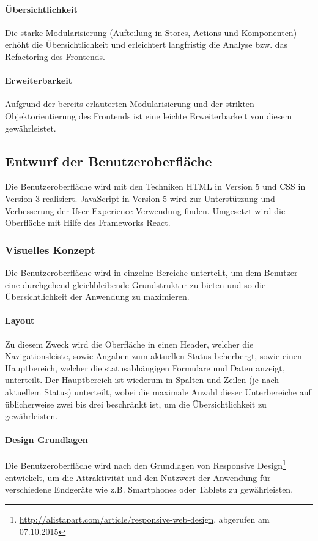 \documentclass[12pt, xcolor=dvipsnames]{scrartcl}
\begin{document}
\paragraph{Übersichtlichkeit}
Die starke Modularisierung (Aufteilung in Stores, Actions und Komponenten) erhöht die Übersichtlichkeit und erleichtert langfristig die Analyse bzw. das Refactoring des Frontends.

\paragraph{Erweiterbarkeit}
Aufgrund der bereits erläuterten Modularisierung und der strikten Objektorientierung des Frontends ist eine leichte Erweiterbarkeit von diesem gewährleistet.

\subsection{Entwurf der Benutzeroberfläche}

Die Benutzeroberfläche wird mit den Techniken HTML in Version 5 und CSS in Version 3 realisiert. JavaScript in Version 5 wird zur Unterstützung und Verbesserung der User Experience Verwendung finden. Umgesetzt wird die Oberfläche mit Hilfe des Frameworks React.

\subsubsection{Visuelles Konzept}

Die Benutzeroberfläche wird in einzelne Bereiche unterteilt, um dem Benutzer eine durchgehend gleichbleibende Grundstruktur zu bieten und so die Übersichtlichkeit der Anwendung zu maximieren.

\paragraph{Layout}
Zu diesem Zweck wird die Oberfläche in einen Header, welcher die Navigationsleiste, sowie Angaben zum aktuellen Status beherbergt, sowie einen Hauptbereich, welcher die statusabhängigen Formulare und Daten anzeigt, unterteilt. Der Hauptbereich ist wiederum in Spalten und Zeilen (je nach aktuellem Status) unterteilt, wobei die maximale Anzahl dieser Unterbereiche auf üblicherweise zwei bis drei beschränkt ist, um die Übersichtlichkeit zu gewährleisten.

\paragraph{Design Grundlagen}
Die Benutzeroberfläche wird nach den Grundlagen von
Responsive Design\footnote{\url{http://alistapart.com/article/responsive-web-design}, abgerufen am 07.10.2015}
entwickelt, um die Attraktivität und den Nutzwert der Anwendung für verschiedene Endgeräte wie z.B. Smartphones oder Tablets zu gewährleisten.
\end{document}
